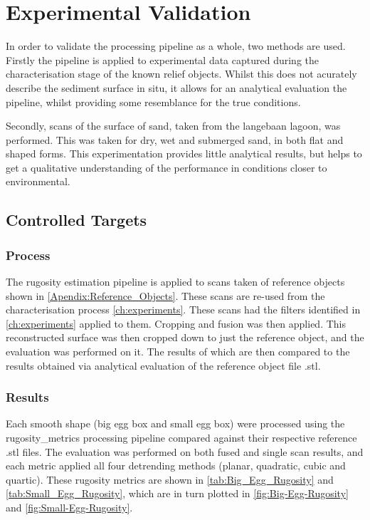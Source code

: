 \chapter{Experimental Validation}
\label{ch:Validation}
In order to validate the processing pipeline as a whole, two methods are used. Firstly the pipeline is applied to experimental data captured during the characterisation stage of the known relief objects. Whilst this does not acurately describe the sediment surface in situ, it allows for an analytical evaluation the pipeline, whilst providing some resemblance for the true conditions.

Secondly, scans of the surface of sand, taken from the langebaan lagoon, was performed. This was taken for dry, wet and submerged sand, in both flat and shaped forms. This experimentation provides little analytical results, but helps to get a qualitative understanding of the performance in conditions closer to environmental.

\section{Controlled Targets}

\subsection{Process}
The rugosity estimation pipeline is applied to scans taken of reference objects shown in \autoref{Apendix:Reference_Objects}. These scans are re-used from the characterisation process \autoref{ch:experiments}. These scans had the filters identified in \autoref{ch:experiments} applied to them. Cropping and fusion was then applied. This reconstructed surface was then cropped down to just the reference object, and the evaluation was performed on it. The results of which are then compared to the results obtained via analytical evaluation of the reference object file .stl. 

\subsection{Results}

Each smooth shape (big egg box and small egg box) were processed using the rugosity\_metrics processing pipeline compared against their respective reference .stl files. The evaluation was performed on both fused and single scan results, and each metric applied all four detrending methods (planar, quadratic, cubic and quartic). These rugosity metrics are shown in \autoref{tab:Big_Egg_Rugosity} and \autoref{tab:Small_Egg_Rugosity}, which are in turn plotted in \autoref{fig:Big-Egg-Rugosity} and \autoref{fig:Small-Egg-Rugosity}.

